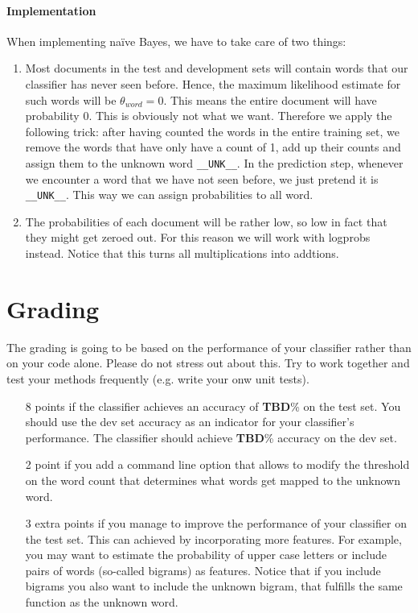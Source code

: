 \documentclass[11pt, leqno, a4paper]{article}
\begin{document}
\paragraph{Implementation} When implementing na\"ive Bayes, we have to take care of two things:
\begin{enumerate}
\item Most documents in the test and development sets will contain words that our classifier has never
seen before. Hence, the maximum likelihood estimate for such words will be $ \theta_{word} = 0 $. This
means the entire document will have probability 0. This is obviously not what we want. Therefore we apply
the following trick: after having counted the words in the entire training set, we remove the words that
have only have a count of 1, add up their counts and assign them to the unknown word \texttt{\_\_UNK\_\_}. In
the prediction step, whenever we encounter a word that we have not seen before, we just pretend it is
\texttt{\_\_UNK\_\_}. This way we can assign probabilities to all word.
\item The probabilities of each document will be rather low, so low in fact that they might get zeroed out.
For this reason we will work with logprobs instead. Notice that this turns all multiplications into addtions.
\end{enumerate}

\section{Grading}
The grading is going to be based on the performance of your classifier rather than on your code alone.
Please do not stress out about this. Try to work together and test your methods frequently (e.g. write
your onw unit tests).

\begin{itemize}
\item[8 points] if the classifier achieves an accuracy of \textbf{TBD}\% on the test set. You should
use the dev set accuracy as an indicator for your classifier's performance. The classifier should
achieve \textbf{TBD}\% accuracy on the dev set.
\item[2 point] if you add a command line option that allows to modify the threshold on the word count
that determines what words get mapped to the unknown word.
\item[3 extra points] if you manage to improve the performance of your classifier on the test set. This
can achieved by incorporating more features. For example, you may want to estimate the probability of 
upper case letters or include pairs of words (so-called bigrams) as features. Notice that if you
include bigrams you also want to include the unknown bigram, that fulfills the same function as the
unknown word.
\end{itemize}
\end{document}
